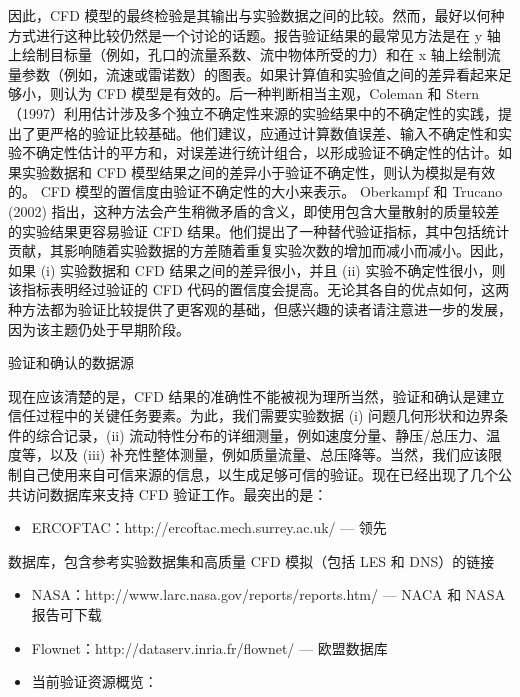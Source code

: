 \documentclass[11pt,a4paper,openany,fontset=none]{ctexbook}
\begin{document}
因此，CFD 模型的最终检验是其输出与实验数据之间的比较。然而，最好以何种方式进行这种比较仍然是一个讨论的话题。报告验证结果的最常见方法是在 y 轴上绘制目标量（例如，孔口的流量系数、流中物体所受的力）和在 x 轴上绘制流量参数（例如，流速或雷诺数）的图表。如果计算值和实验值之间的差异看起来足够小，则认为 CFD 模型是有效的。后一种判断相当主观，Coleman 和 Stern（1997）利用估计涉及多个独立不确定性来源的实验结果中的不确定性的实践，提出了更严格的验证比较基础。他们建议，应通过计算数值误差、输入不确定性和实验不确定性估计的平方和，对误差进行统计组合，以形成验证不确定性的估计。如果实验数据和 CFD 模型结果之间的差异小于验证不确定性，则认为模拟是有效的。 CFD 模型的置信度由验证不确定性的大小来表示。 Oberkampf 和 Trucano (2002) 指出，这种方法会产生稍微矛盾的含义，即使用包含大量散射的质量较差的实验结果更容易验证 CFD 结果。他们提出了一种替代验证指标，其中包括统计贡献，其影响随着实验数据的方差随着重复实验次数的增加而减小而减小。因此，如果 (i) 实验数据和 CFD 结果之间的差异很小，并且 (ii) 实验不确定性很小，则该指标表明经过验证的 CFD 代码的置信度会提高。无论其各自的优点如何，这两种方法都为验证比较提供了更客观的基础，但感兴趣的读者请注意进一步的发展，因为该主题仍处于早期阶段。

验证和确认的数据源

现在应该清楚的是，CFD 结果的准确性不能被视为理所当然，验证和确认是建立信任过程中的关键任务要素。为此，我们需要实验数据
(i) 问题几何形状和边界条件的综合记录，(ii) 流动特性分布的详细测量，例如速度分量、静压/总压力、温度等，以及 (iii) 补充性整体测量，例如质量流量、总压降等。当然，我们应该限制自己使用来自可信来源的信息，以生成足够可信的验证。现在已经出现了几个公共访问数据库来支持 CFD 验证工作。最突出的是：

\begin{itemize}

\item ERCOFTAC：http://ercoftac.mech.surrey.ac.uk/ — 领先

\end{itemize}

数据库，包含参考实验数据集和高质量 CFD 模拟（包括 LES 和 DNS）的链接

\begin{itemize}

\item NASA：http://www.larc.nasa.gov/reports/reports.htm/ — NACA 和 NASA 报告可下载

\item Flownet：http://dataserv.inria.fr/flownet/ — 欧盟数据库

\item 当前验证资源概览：

\end{itemize}
\end{document}

